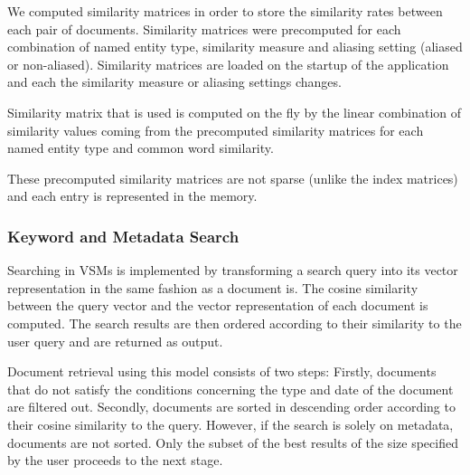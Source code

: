 We computed similarity matrices in order to store the similarity rates between each pair of documents. Similarity matrices were precomputed for each combination of named entity type, similarity measure and aliasing setting (aliased or non-aliased).
Similarity matrices are loaded on the startup of the application and each the similarity measure or aliasing settings changes.

Similarity matrix that is used is computed on the fly by the linear combination of similarity values coming from the precomputed similarity matrices for each named entity type and common word similarity.

These precomputed similarity matrices are not sparse (unlike the index matrices) and each entry is represented in the memory.   

\subsubsection{Keyword and Metadata Search}\label{sec:keyword_search}

Searching in VSMs is implemented by transforming a search query into its vector representation in the same fashion as a document is. The cosine similarity between the query vector and the vector representation of each document is computed. The search results are then ordered according to their similarity to the user query and are returned as output. 

Document retrieval using this model consists of two steps: Firstly, documents that do not satisfy the conditions concerning the type and date of the document are filtered out. Secondly, documents are sorted in descending order according to their cosine similarity to the query. However, if the search is solely on metadata, documents are not sorted. Only the subset of the best results of the size specified by the user proceeds to the next stage.

